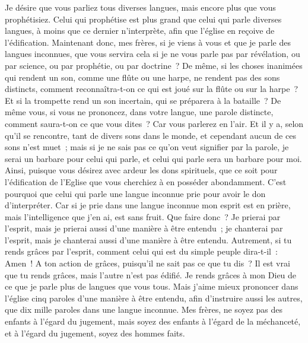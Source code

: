 \begin{multicols}{2}
Je désire que vous parliez tous diverses langues, mais encore plus que vous prophétisiez. Celui qui prophétise est plus grand que celui qui parle diverses langues, à moins que ce dernier n'interprète, afin que l'église en reçoive de l'édification.
Maintenant donc, mes frères, si je viens à vous et que je parle des langues inconnues, que vous servira cela si je ne vous parle pas par révélation, ou par science, ou par prophétie, ou par doctrine~?
De même, si les choses inanimées qui rendent un son, comme une flûte ou une harpe, ne rendent pas des sons distincts, comment reconnaîtra-t-on ce qui est joué sur la flûte ou sur la harpe~?
Et si la trompette rend un son incertain, qui se préparera à la bataille~?
De même vous, si vous ne prononcez, dans votre langue, une parole distincte, comment saura-t-on ce que vous dites~? Car vous parlerez en l'air.
Et il y a, selon qu'il se rencontre, tant de divers sons dans le monde, et cependant aucun de ces sons n'est muet~;
mais si je ne sais pas ce qu'on veut signifier par la parole, je serai un barbare pour celui qui parle, et celui qui parle sera un barbare pour moi.
Ainsi, puisque vous désirez avec ardeur les dons spirituels, que ce soit pour l'édification de l'Eglise que vous cherchiez à en posséder abondamment.
C'est pourquoi que celui qui parle une langue inconnue prie pour avoir le don d'interpréter.
Car si je prie dans une langue inconnue mon esprit est en prière, mais l'intelligence que j'en ai, est sans fruit.
Que faire donc~? Je prierai par l'esprit, mais je prierai aussi d'une manière à être entendu~; je chanterai par l'esprit, mais je chanterai aussi d'une manière à être entendu.
Autrement, si tu rends grâces par l'esprit, comment celui qui est du simple peuple dira-t-il~: Amen~! A ton action de grâces, puisqu'il ne sait pas ce que tu dis~?
Il est vrai que tu rends grâces, mais l'autre n'est pas édifié.
Je rends grâces à mon Dieu de ce que je parle plus de langues que vous tous.
Mais j'aime mieux prononcer dans l'église cinq paroles d'une manière à être entendu, afin d'instruire aussi les autres, que dix mille paroles dans une langue inconnue.
Mes frères, ne soyez pas des enfants à l'égard du jugement, mais soyez des enfants à l'égard de la méchanceté, et à l'égard du jugement, soyez des hommes faits.

\end{multicols}
